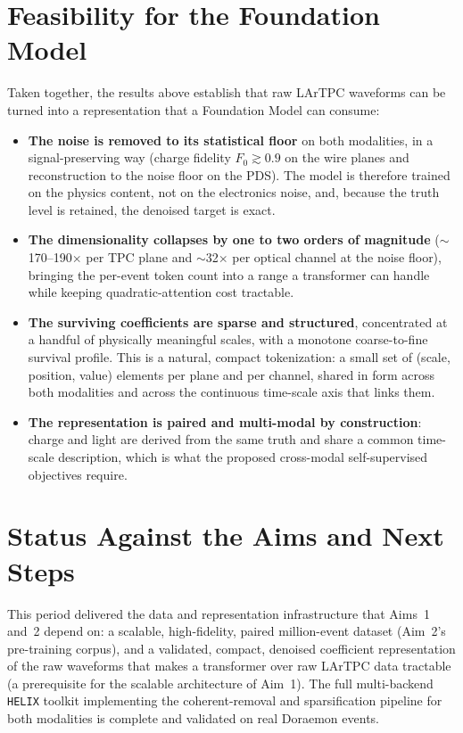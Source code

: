 \documentclass[11pt]{article}
\begin{document}
\section{Feasibility for the Foundation Model}
Taken together, the results above establish that raw LArTPC waveforms can be turned into a
representation that a Foundation Model can consume:
\begin{itemize}\setlength{\itemsep}{2pt}
    \item \textbf{The noise is removed to its statistical floor} on both modalities, in a
    signal-preserving way (charge fidelity $F_0 \gtrsim 0.9$ on the wire planes and
    reconstruction to the noise floor on the PDS). The model is therefore trained on the
    physics content, not on the electronics noise, and, because the truth level is retained,
    the denoised target is exact.
    \item \textbf{The dimensionality collapses by one to two orders of magnitude}
    ($\sim$170--190$\times$ per TPC plane and $\sim$32$\times$ per optical channel at the
    noise floor), bringing the per-event token count into a range a transformer can handle
    while keeping quadratic-attention cost tractable.
    \item \textbf{The surviving coefficients are sparse and structured}, concentrated at a
    handful of physically meaningful scales, with a monotone coarse-to-fine survival
    profile. This is a natural, compact tokenization: a small set of (scale, position,
    value) elements per plane and per channel, shared in form across both modalities and
    across the continuous time-scale axis that links them.
    \item \textbf{The representation is paired and multi-modal by construction}: charge and
    light are derived from the same truth and share a common time-scale description, which
    is what the proposed cross-modal self-supervised objectives require.
\end{itemize}

\section{Status Against the Aims and Next Steps}
This period delivered the data and representation infrastructure that Aims~1 and~2 depend
on: a scalable, high-fidelity, paired million-event dataset (Aim~2's pre-training corpus),
and a validated, compact, denoised coefficient representation of the raw waveforms that
makes a transformer over raw LArTPC data tractable (a prerequisite for the scalable
architecture of Aim~1). The full multi-backend \texttt{HELIX} toolkit implementing the
coherent-removal and sparsification pipeline for both modalities is complete and validated
on real Doraemon events.
\end{document}
